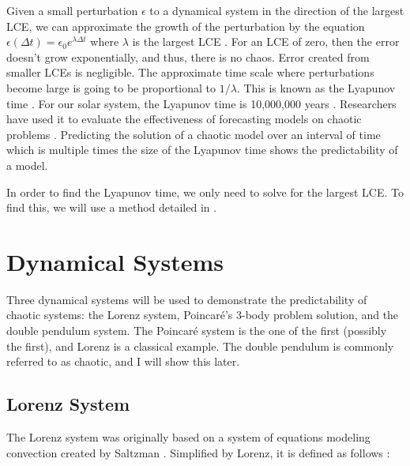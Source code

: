 \documentclass{article}
\begin{document}
Given a small perturbation $\epsilon$ to a dynamical system in the direction of 
the largest LCE, we can approximate the growth of the perturbation by the 
equation $\epsilon(\Delta t) = \epsilon_0 e^{\lambda \Delta t}$ where $\lambda$ 
is the largest LCE
\cite{bezruchko2010extracting}. For an LCE of zero, then the error doesn't grow
exponentially, and thus, there is no chaos. Error created
from smaller LCEs is negligible. The approximate time scale where 
perturbations become large is going to be proportional to $1 / \lambda$. This is
known as the Lyapunov time \cite{bezruchko2010extracting}. For our solar
system, the Lyapunov time is 10,000,000 years \cite{oestreicher2007history}.
Researchers have used it to evaluate the effectiveness of forecasting models on
chaotic problems \cite{pathak2018model}. Predicting the solution of
a chaotic model over an interval of time which is multiple times the size of the
Lyapunov time shows the predictability of a model.

In order to find the Lyapunov time, we only need to solve for the largest LCE. 
To find this, we will use a method detailed in \cite{viswanath1998lyapunov}.


\section{Dynamical Systems}

Three dynamical systems will be used to demonstrate the predictability of 
chaotic systems: the Lorenz system, Poincaré's 3-body 
problem solution, and the double pendulum system.
The Poincaré system is the one of the first (possibly the first), and Lorenz
is a classical example. The double pendulum is commonly referred to as chaotic, 
and I will show this later.


\subsection{Lorenz System}


The Lorenz system was originally based on a system of equations modeling 
convection created by Saltzman \cite{lorenz1963deterministic} 
\cite{saltzman1962finite}. Simplified by Lorenz, it is defined as follows
\cite{lorenz1963deterministic}:
\end{document}
